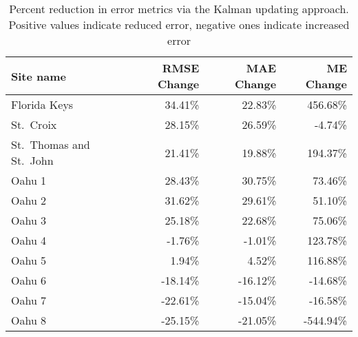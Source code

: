 \begin{table}[htbp]
\centering
\caption[Summary of percent change in error metrics for each test site]{Percent reduction in error metrics via the Kalman updating approach. Positive values indicate reduced error, negative ones indicate increased error}
\label{tab:allsite-percent-change}
\begin{tabular}{lrrr}
\toprule
 
Site name & RMSE Change & MAE Change & ME Change \\
\midrule
Florida Keys & 34.41\% & 22.83\% & 456.68\% \\
St.~Croix & 28.15\% & 26.59\% & -4.74\% \\
St.~Thomas and St.~John & 21.41\% & 19.88\% & 194.37\% \\
Oahu 1 & 28.43\% & 30.75\% & 73.46\% \\
Oahu 2 & 31.62\% & 29.61\% & 51.10\% \\
Oahu 3 & 25.18\% & 22.68\% & 75.06\% \\
Oahu 4 & -1.76\% & -1.01\% & 123.78\% \\
Oahu 5 & 1.94\% & 4.52\% & 116.88\% \\
Oahu 6 & -18.14\% & -16.12\% & -14.68\% \\
Oahu 7 & -22.61\% & -15.04\% & -16.58\% \\
Oahu 8 & -25.15\% & -21.05\% & -544.94\% \\
\bottomrule
\end{tabular}
\end{table}
